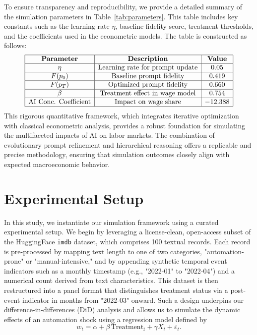 \documentclass{article}
\begin{document}
To ensure transparency and reproducibility, we provide a detailed summary of the simulation parameters in Table~\ref{tab:parameters}. This table includes key constants such as the learning rate \(\eta\), baseline fidelity score, treatment thresholds, and the coefficients used in the econometric models. The table is constructed as follows:
\[
\begin{array}{|c|c|c|}
\hline
\textbf{Parameter} & \textbf{Description} & \textbf{Value} \\
\hline
\eta & \text{Learning rate for prompt update} & 0.05 \\
\hline
F(p_0) & \text{Baseline prompt fidelity} & 0.419 \\
\hline
F(p_{T}) & \text{Optimized prompt fidelity} & 0.660 \\
\hline
\beta & \text{Treatment effect in wage model} & 0.754 \\
\hline
\text{AI Conc. Coefficient} & \text{Impact on wage share} & -12.388 \\
\hline
\end{array}
\]
This rigorous quantitative framework, which integrates iterative optimization with classical econometric analysis, provides a robust foundation for simulating the multifaceted impacts of AI on labor markets. The combination of evolutionary prompt refinement and hierarchical reasoning offers a replicable and precise methodology, ensuring that simulation outcomes closely align with expected macroeconomic behavior.

\section{Experimental Setup}
In this study, we instantiate our simulation framework using a curated experimental setup. We begin by leveraging a license-clean, open-access subset of the HuggingFace \texttt{imdb} dataset, which comprises 100 textual records. Each record is pre-processed by mapping text length to one of two categories, "automation-prone" or "manual-intensive," and by appending synthetic temporal event indicators such as a monthly timestamp (e.g., "2022-01" to "2022-04") and a numerical count derived from text characteristics. This dataset is then restructured into a panel format that distinguishes treatment status via a post-event indicator in months from "2022-03" onward. Such a design underpins our difference-in-differences (DiD) analysis and allows us to simulate the dynamic effects of an automation shock using a regression model defined by
\[
w_t = \alpha + \beta\,\text{Treatment}_t + \gamma X_t + \varepsilon_t.
\]
\end{document}
